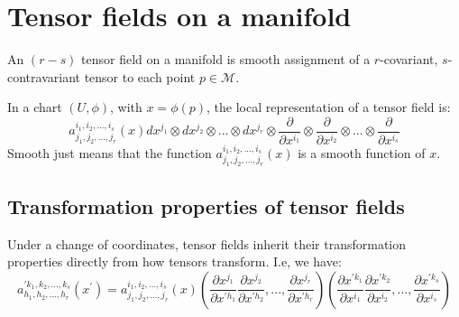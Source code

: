     \section{Tensor fields on a manifold}
      \begin{definition}
        An $(r-s)$ tensor field on a manifold is smooth assignment of a
        $r$-covariant, $s$-contravariant tensor to each point $p \in
        \mathcal{M}$. 
      \end{definition}
      \begin{remark}
        In a chart $(U, \phi)$, with $x = \phi(p)$, the local representation of a tensor field is:
        \[a^{i_1,i_2,...,i_s}_{j_1,j_2,...,j_r}(x)dx^{j_1}\otimes dx^{j_2}
        \otimes ...\otimes dx^{j_r} \otimes \frac{\partial}{\partial x^{i_1}}
        \otimes \frac{\partial}{\partial x^{i_2}} \otimes ... \otimes
        \frac{\partial}{\partial x^{i_s}}\]
        Smooth just means that the function
        $a^{i_1,i_2,...,i_s}_{j_1,j_2,...,j_r}(x)$ is a smooth function of
        $x$.
      \end{remark}
      \subsection{Transformation properties of tensor fields}
        Under a change of coordinates, tensor fields inherit their
        transformation properties directly from how tensors transform. I.e,
        we have:
        \begin{equation}
          a^{\prime k_1,k_2,...,k_s}_{h_1,h_2,...,h_r}(x^\prime) =
          a^{i_1,i_2,...,i_s}_{j_1,j_2,...,j_r}(x) \left(\frac{\partial
          x^{j_1}}{\partial x^{\prime h_1}} \frac{\partial x^{j_2}}{\partial
          x^{\prime h_2}},..., \frac{\partial x^{j_r}}{\partial x^{\prime
          h_r}} \right) \left(\frac{\partial x^{\prime k_1}}{\partial
          x^{i_1}} \frac{\partial x^{\prime k_2}}{\partial x^{i_2}} ,...,
          \frac{\partial x^{\prime k_s}}{\partial x^{i_s}}\right)
        \end{equation}


      